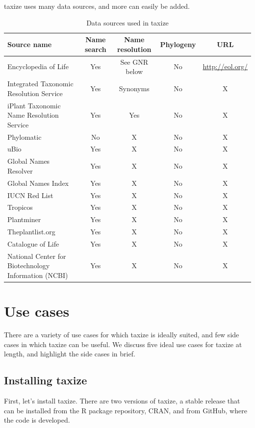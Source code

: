 \documentclass[letterpaper,superscriptaddress,showkeys,longbibliography]{revtex4-1}\usepackage{graphicx, color}
\begin{document}
taxize uses many data sources, and more can easily be added. 

\begin{table}[ht]
\caption{Data sources used in taxize} %
\centering %
\begin{tabular}{|l|ccc|c|}
\hline
Source name &  Name search & Name resolution & Phylogeny & URL  \\
\hline
Encyclopedia of Life & Yes & See GNR below & No & \url{http://eol.org/} \\
Integrated Taxonomic Resolution Service & Yes & Synonyms & No & X\\
iPlant Taxonomic Name Resolution Service & Yes & Yes & No & X \\
Phylomatic & No & X & No & X \\
uBio & Yes & X & No & X \\
Global Names Resolver & Yes & X & No & X \\
Global Names Index & Yes & X & No & X \\
IUCN Red List & Yes & X & No & X \\
Tropicos & Yes & X & No & X \\
Plantminer & Yes & X & No & X \\
Theplantlist.org & Yes & X & No & X \\
Catalogue of Life & Yes & X & No & X \\
National Center for Biotechnology Information (NCBI) & Yes & X & No & X \\
\hline
\end{tabular}
\label{table:nonlin} %
\end{table}

\section{Use cases}

There are a variety of use cases for which taxize is ideally suited, and few side cases in which taxize can be useful. We discuss five ideal use cases for taxize at length, and highlight the side cases in brief.

\subsection{Installing taxize}

First, let's install taxize. There are two versions of taxize, a stable release that can be installed from the R package repository, CRAN, and from GitHub, where the code is developed. 
\end{document}
